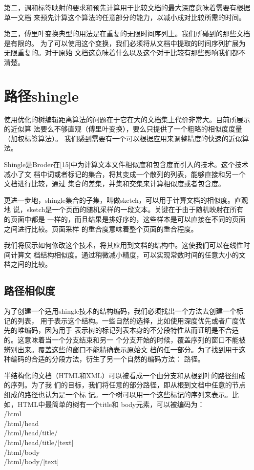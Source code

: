 第二，调和标签映射的要求和预先计算用于比较文档的最大深度意味着需要有根据单一文档
来预先计算这个算法的任意部分的能力，以减小成对比较所需的时间。

第三，傅里叶变换典型的用法是在重复的无限时间序列上。我们所碰到的那些文档是有限的。
为了可以使用这个变换，我们必须将从文档中提取的时间序列扩展为无限重复的。对于原始
文档这意味着什么以及这个对于比较有那些影响我们都不清楚。

\section{路径shingle}
使用优化的树编辑距离算法的问题在于它在大的文档集上代价非常大。目前所展示的近似算
法要么不够直观（傅里叶变换），要么只提供了一个粗略的相似度度量（加权标签算法）。
我们感到需要有一个可以根据应用来调整精度的快速的近似算法。

Shingle是Broder在[15]中为计算文本文件相似度和包含度而引入的技术。这个技术减小了文
档中词或者标记的集合，将其变成一个散列的列表，能够直接和另一个文档进行比较，通过
集合的差集，并集和交集来计算相似度或者包含度。

更进一步地，shingle集合的子集，叫做sketch，可以用于计算文档的相似度。直观地
说，sketch是一个页面的随机采样的一段文本。关键在于由于随机映射在所有的页面中都是
一样的，而且结果是排好序的，这些样本是可以直接在不同的页面之间进行比较。页面采样
的重合度意味着整个页面的重合程度。

我们将展示如何修改这个技术，将其应用到文档的结构中。这使我们可以在线性时间计算文
档结构相似度。通过稍微减小精度，可以实现常数时间的任意大小的文档之间的比较。

\subsection{路径相似度}
为了创建一个适用shingle技术的结构编码，我们必须找出一个方法去创建一个标记的列表，
用于表示这个结构。一些自然的选择，比如使用深度优先或者广度优先的堆编码，因为用于
表示树的标记列表本身的不分段特性从而证明是不合适的。这意味着当一个分支结束和另一
个分支开始的时候，覆盖序列的窗口不能被辨别出来。覆盖这些的窗口不能精确表示原始文
档的任一部分。为了找到用于这种编码的合适的分段方法，衍生了另一个自然的编码方法：
路径。

半结构化的文档（HTML和XML）可以被看成一个由分支和从根到叶的路径组成的序列。为了我
们的目标，我们将任意的部分路径，即从根到文档中任意的节点组成的路径也认为是一个标
记。一个树可以用一个这些标记的序列来表示。比如，HTML中最简单的树有一个title和
body元素，可以被编码为：\\
/html\\
/html/head\\
/html/head/title/\\
/html/head/title/[text]\\
/html/body\\
/html/body/[text]

